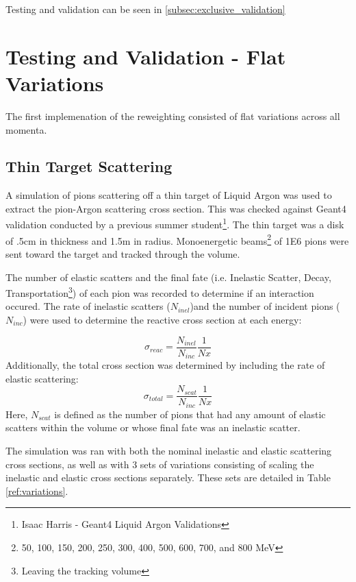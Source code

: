 \documentclass[12pt]{article}
\begin{document}
Testing and validation can be seen in \ref{subsec:exclusive_validation}

\section{Testing and Validation - Flat Variations}
The first implemenation of the reweighting consisted of flat variations across all momenta.


\subsection{Thin Target Scattering}
A simulation of pions scattering off a thin target of Liquid Argon was used to extract the pion-Argon scattering cross section. %
This was checked against Geant4 validation conducted by a previous summer student\footnote{Isaac Harris - Geant4 Liquid Argon Validations}.
The thin target was a disk of .5cm in thickness and 1.5m in radius. Monoenergetic beams\footnote{{50, 100, 150, 200, 250, 300, 400, 500, 600, 700, and 800} MeV } of 1E6 pions were sent toward the target and tracked through the volume. 

The number of elastic scatters and the final fate (i.e. Inelastic Scatter, Decay, Transportation\footnote{Leaving the tracking volume}) of each pion was recorded to determine if an interaction occured. The rate of inelastic scatters ($N_{inel}$)and the number of incident pions ($N_{inc}$) were used to determine the reactive cross section at each energy: 

\begin{equation}\label{ref:reactive_xsec}
\sigma_{reac} = \frac{N_{inel}}{N_{inc}}\frac{1}{Nx}
\end{equation}
Additionally, the total cross section was determined by including the rate of elastic scattering:
\begin{equation}\label{ref:total_xsec}
\sigma_{total} = \frac{N_{scat}}{N_{inc}}\frac{1}{Nx}
\end{equation}
Here, $N_{scat}$ is defined as the number of pions that had any amount of elastic scatters within the volume or whose final fate was an inelastic scatter. 

The simulation was ran with both the nominal inelastic and elastic scattering cross sections, as well as with 3 sets of variations consisting of scaling the inelastic and elastic cross sections separately. These sets are detailed in Table \ref{ref:variations}. 
\end{document}
